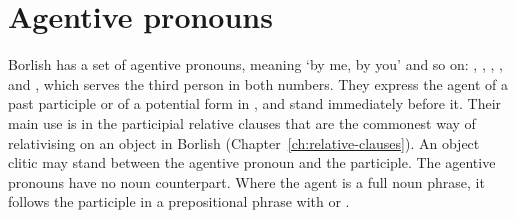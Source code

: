 \section{Agentive pronouns}\label{sec:agentive}
Borlish has a set of agentive pronouns, meaning `by me, by you' and so on:  ,  ,  ,  , and  , which serves the third person in both numbers. They express the agent of a past participle or of a potential form in , and stand immediately before it. Their main use is in the participial relative clauses that are the commonest way of relativising on an object in Borlish (Chapter~\ref{ch:relative-clauses}).
An object clitic may stand between the agentive pronoun and the participle.
The agentive pronouns have no noun counterpart. Where the agent is a full noun phrase, it follows the participle in a prepositional phrase with  or .

